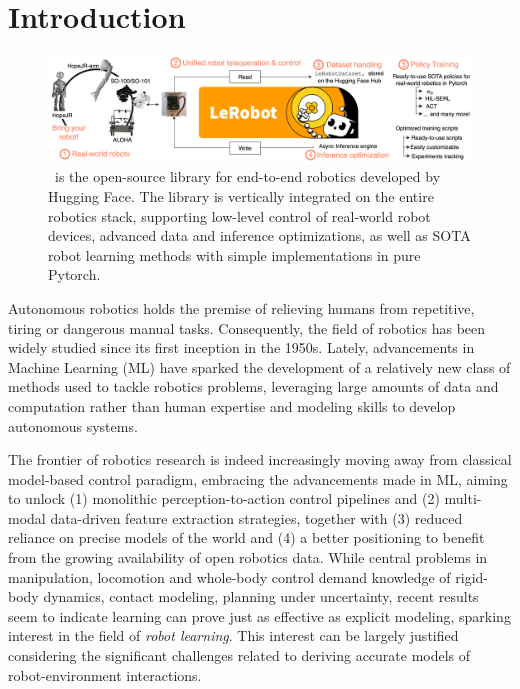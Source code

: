 \section{Introduction}

\begin{figure}
    \centering
    \includegraphics[width=\linewidth]{figures/ch1/ch1-lerobot-figure1.png}
    \caption{\lerobot~is the open-source library for end-to-end robotics developed by Hugging Face. The library is vertically integrated on the entire robotics stack, supporting low-level control of real-world robot devices, advanced data and inference optimizations, as well as  SOTA robot learning methods with simple implementations in pure Pytorch.}
    \label{fig:figure1}
\end{figure}

Autonomous robotics holds the premise of relieving humans from repetitive, tiring or dangerous manual tasks.
Consequently, the field of robotics has been widely studied since its first inception in the 1950s.
Lately, advancements in Machine Learning (ML) have sparked the development of a relatively new class of methods used to tackle robotics problems, leveraging large amounts of data and computation rather than human expertise and modeling skills to develop autonomous systems.

The frontier of robotics research is indeed increasingly moving away from classical model-based control paradigm, embracing the advancements made in ML, aiming to unlock (1) monolithic perception-to-action control pipelines and (2) multi-modal data-driven feature extraction strategies, together with (3) reduced reliance on precise models of the world and (4) a better positioning to benefit from the growing availability of open robotics data.
While central problems in manipulation, locomotion and whole-body control demand knowledge of rigid-body dynamics, contact modeling, planning under uncertainty, recent results seem to indicate learning can prove just as effective as explicit modeling, sparking interest in the field of \emph{robot learning}.
This interest can be largely justified considering the significant challenges related to deriving accurate models of robot-environment interactions.

